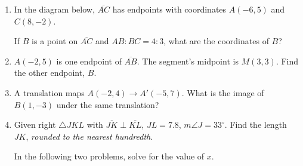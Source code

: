 \documentclass[12pt, twoside]{article}
\begin{document}
\begin{enumerate}
  \item In the diagram below, $\overline{AC}$ has endpoints with coordinates $A(-6,5)$ and $C(8, -2)$.
    \begin{center} %
    \end{center}
    If $B$ is a point on $\overline{AC}$ and $AB {:} BC = 4{:}3$,  what  are  the coordinates of $B$? \vspace{4cm}

  \item $A(-2,5)$ is one endpoint of $\overline{AB}$. The segment's midpoint is $M(3,3)$. Find the other endpoint, $B$. \vspace{3cm}

  \item A translation maps $A(-2,4) \rightarrow A'(-5,7)$. What is the image of $B(1,-3)$ under the same translation?  \vspace{3cm}

\newpage

  \item Given right $\triangle JKL$ with $\overline{JK} \perp \overline{KL}$, $JL=7.8$, $m\angle J=33^\circ$. Find the length $JK$, \emph{rounded to the nearest hundredth}.
    \begin{center}
    \end{center}
\vspace{1cm}

  In the following two problems, solve for the value of $x$.


\end{enumerate}
\end{document}
